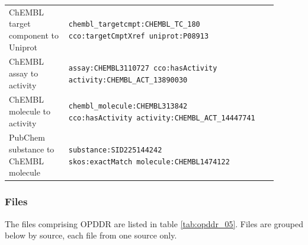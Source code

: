 \begin{table}
\begin{tabular}{p{0.2\linewidth}p{0.7\linewidth}}
ChEMBL target component to Uniprot & \makecell[l]{\texttt{chembl\_targetcmpt:CHEMBL\_TC\_180}\\ \texttt{cco:targetCmptXref uniprot:P08913}}\\
ChEMBL assay to activity & \makecell[l]{\texttt{assay:CHEMBL3110727 cco:hasActivity}\\ \texttt{activity:CHEMBL\_ACT\_13890030}}\\
ChEMBL molecule to activity & \makecell[l]{\texttt{chembl\_molecule:CHEMBL313842}\\ \texttt{cco:hasActivity activity:CHEMBL\_ACT\_14447741}}\\
PubChem substance to ChEMBL molecule & \makecell[l]{\texttt{substance:SID225144242}\\ \texttt{skos:exactMatch molecule:CHEMBL1474122}} \\
\hline
\end{tabular}
\end{table}

\subsubsection{Files}

The files comprising OPDDR are listed in table \ref{tab:opddr_05}.  Files are grouped below by source, each file from one source only.

